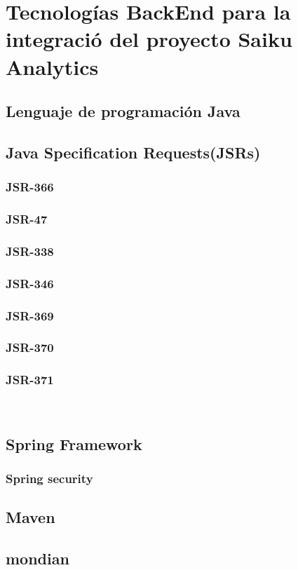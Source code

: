 \section{Tecnolog\'{i}as BackEnd para la integraci\'{o} del proyecto Saiku Analytics}
	\subsection{Lenguaje de programaci\'{o}n Java}
	\subsection{Java Specification Requests(JSRs)}
		\subsubsection{JSR-366}
		\subsubsection{JSR-47}
		\subsubsection{JSR-338}
		\subsubsection{JSR-346}
		\subsubsection{JSR-369}
		\subsubsection{JSR-370}
		\subsubsection{JSR-371}\\
	\subsection{Spring Framework}
		\subsubsection{Spring security}
	\subsection{Maven}
	\subsection{mondian}
